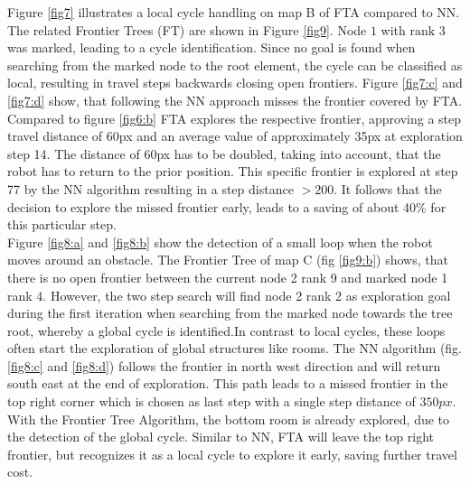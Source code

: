 \documentclass[twocolumn]{svjour3}[2016]
\begin{document}
Figure \ref{fig7} illustrates a local cycle handling on map B of FTA compared to NN. The related Frontier Trees (FT) are shown in Figure \ref{fig9}. Node $1$ with $\textrm{rank } 3$ was marked, leading to a cycle identification. Since no goal is found when searching from the marked node to the root element, the cycle can be classified as local, resulting in travel steps backwards closing open frontiers. Figure \ref{fig7:c} and \ref{fig7:d} show, that following the NN approach misses the frontier covered by FTA. Compared to figure \ref{fig6:b} FTA explores the respective frontier, approving a step travel distance of 60px and an average value of approximately 35px at exploration step 14. The distance of 60px has to be doubled, taking into account, that the robot has to return to the prior position. This specific frontier is explored at step 77 by the NN algorithm resulting in a step distance $> 200$. It follows that the decision to explore the missed frontier early, leads to a saving of about 40\% for this particular step.\\
Figure \ref{fig8:a} and \ref{fig8:b} show the detection of a small loop when the robot moves around an obstacle. The Frontier Tree of map C (fig \ref{fig9:b}) shows, that there is no open frontier between the current node 2 rank 9 and marked node 1 rank 4. However, the two step search will find node 2 rank 2 as exploration goal during the first iteration when searching from the marked node towards the tree root, whereby a global cycle is identified.In contrast to local cycles, these loops often start the exploration of global structures like rooms. The NN algorithm (fig. \ref{fig8:c} and \ref{fig8:d}) follows the frontier in north west direction and will return south east at the end of exploration. This path leads to a missed frontier in the top right corner which is chosen as last step with a single step distance of $350px$. With the Frontier Tree Algorithm, the bottom room is already explored, due to the detection of the global cycle. Similar to NN, FTA will leave the top right frontier, but recognizes it as a local cycle to explore it early, saving further travel cost.
\end{document}
